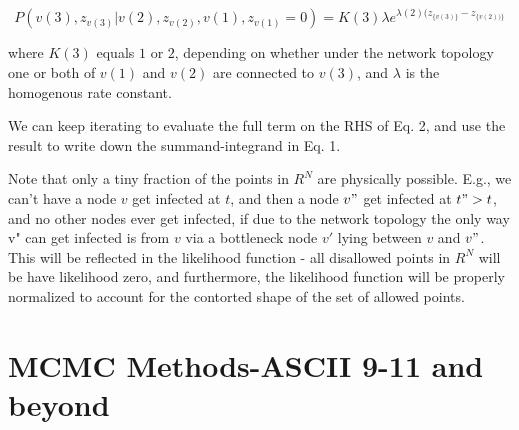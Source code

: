 \documentclass{article}
\begin{document}
	\begin{equation*}
		P(v(3), z_{v(3)} | v(2), z_{v(2)}, v(1), z_{v(1)} = 0)  =  
			K(3) \lambda e^{\lambda(2) (z_{\{v(3)\}} - z_{\{v(2))\}}} 
	\end{equation*}

	where $K(3)$ equals $1$ or $2$, depending on whether under the network
	topology one or both of $v(1)$ and $v(2)$ are connected to $v(3)$, and
	$\lambda$ is the homogenous rate constant.

	We can keep iterating to evaluate the full term on the RHS of Eq. 2, and
	use the result to write down the summand-integrand in Eq. 1. 

	Note that only a tiny fraction of the points in $R^{N}$ are physically
	possible. E.g., we can't have a node $v$ get infected at $t$, and then a
	node $v"$ get infected at $t" > t$, and no other nodes ever get infected,
	if due to the network topology the only way v" can get infected is
	from $v$ via a bottleneck node $v'$ lying between $v$ and $v"$. This will be
	reflected in the likelihood function - all disallowed points in $R^{N}$
	will be have likelihood zero, and furthermore, the likelihood function
	will be properly normalized to account for the contorted shape of the
	set of allowed points.








		



























\section{MCMC Methods-ASCII 9-11 and beyond}
\end{document}
